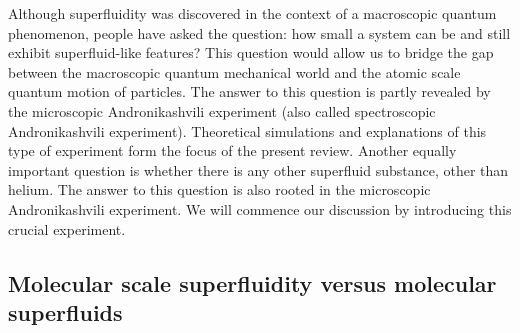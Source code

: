 \documentclass[12pt]{iopart}
\begin{document}
Although superfluidity was discovered in the context of a macroscopic quantum phenomenon, people have asked the question: 
how small a system can be and still exhibit superfluid-like features? 
This question would allow us to bridge the gap between the macroscopic quantum mechanical world and the atomic scale quantum motion of particles.
The answer to this question is partly revealed by the microscopic Andronikashvili experiment (also called spectroscopic Andronikashvili experiment). Theoretical simulations and explanations of this type of experiment form the focus of the present review. 
Another equally important question is whether there is any other superfluid substance, other than helium. 
The answer to this question is also rooted in the microscopic Andronikashvili experiment. 
We will commence  our discussion by introducing this crucial experiment.

\subsection{Molecular scale superfluidity versus molecular superfluids} \label{subsec:vs}
\end{document}
